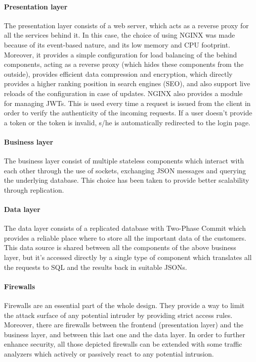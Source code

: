 \paragraph{Presentation layer} The presentation layer consists of a web server, which acts as a reverse proxy for all the services behind it. In this case, the choice of using NGINX was made because of its event-based nature, and its low memory and CPU footprint. Moreover, it provides a simple configuration for load balancing of the behind components, acting as a reverse proxy (which hides these components from the outside), provides efficient data compression and encryption, which directly provides a higher ranking position in search engines (SEO), and also support live reloads of the configuration in case of updates. NGINX also provides a module for managing JWTs. This is used every time a request is issued from the client in order to verify the authenticity of the incoming requests. If a user doesn't provide a token or the token is invalid, s/he is automatically redirected to the login page.

\paragraph{Business layer} The business layer consist of multiple stateless components which interact with each other through the use of sockets, exchanging JSON messages and querying the underlying database. This choice has been taken to provide better scalability through replication.

\paragraph{Data layer} The data layer consists of a replicated database with Two-Phase Commit which provides a reliable place where to store all the important data of the customers. This data source is shared between all the components of the above business layer, but it's accessed directly by a single type of component which translates all the requests to SQL and the results back in suitable JSONs.

\paragraph{Firewalls} Firewalls are an essential part of the whole design. They provide a way to limit the attack surface of any potential intruder by providing strict access rules. Moreover, there are firewalls between the frontend (presentation layer) and the business layer, and between this last one and the data layer. In order to further enhance security, all those depicted firewalls can be extended with some traffic analyzers which actively or passively react to any potential intrusion.


